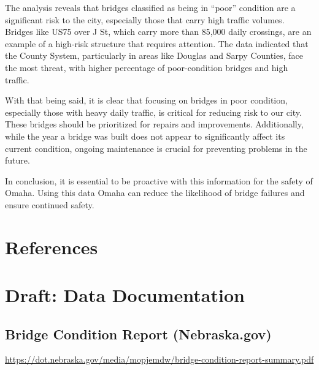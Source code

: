 \documentclass[
  letterpaper,
  DIV=11,
  numbers=noendperiod]{scrreprt}
\newlength{\cslhangindent}
\newenvironment{CSLReferences}[2] %
 {\begin{list}{}{%
  \setlength{\itemindent}{0pt}
  \setlength{\leftmargin}{0pt}
  \setlength{\parsep}{0pt}
  \ifodd #1
   \setlength{\leftmargin}{\cslhangindent}
   \setlength{\itemindent}{-1\cslhangindent}
  \fi
  \setlength{\itemsep}{#2\baselineskip}}}
 {\end{list}}
\begin{document}
The analysis reveals that bridges classified as being in ``poor''
condition are a significant risk to the city, especially those that
carry high traffic volumes. Bridges like US75 over J St, which carry
more than 85,000 daily crossings, are an example of a high-risk
structure that requires attention. The data indicated that the County
System, particularly in areas like Douglas and Sarpy Counties, face the
most threat, with higher percentage of poor-condition bridges and high
traffic.

With that being said, it is clear that focusing on bridges in poor
condition, especially those with heavy daily traffic, is critical for
reducing risk to our city. These bridges should be prioritized for
repairs and improvements. Additionally, while the year a bridge was
built does not appear to significantly affect its current condition,
ongoing maintenance is crucial for preventing problems in the future.

In conclusion, it is essential to be proactive with this information for
the safety of Omaha. Using this data Omaha can reduce the likelihood of
bridge failures and ensure continued safety.


\chapter*{References}\label{references}


\label{refs}
\begin{CSLReferences}{0}{1}
\end{CSLReferences}

\cleardoublepage
{}
{}
\appendix

\chapter{Draft: Data Documentation}\label{draft-data-documentation}

\section{Bridge Condition Report
(Nebraska.gov)}\label{bridge-condition-report-nebraska.gov}

\url{https://dot.nebraska.gov/media/mopjemdw/bridge-condition-report-summary.pdf}
\end{document}
